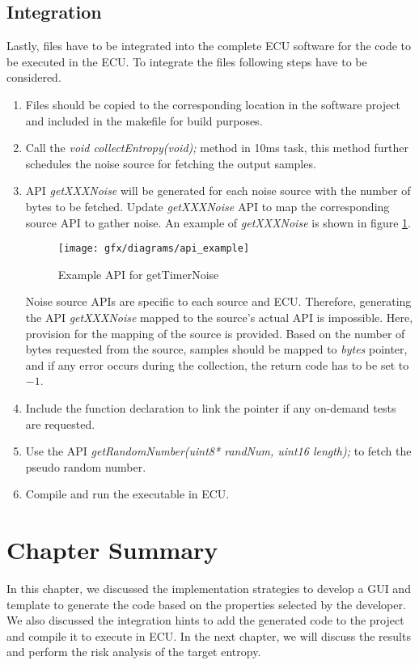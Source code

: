 \subsection{Integration}
\label{subsec:Imp:FI:Int}
Lastly, files have to be integrated into the complete ECU software for the code to be executed in the ECU. To integrate the files following steps have to be considered.
\begin{enumerate}
	\item Files should be copied to the corresponding location in the software project and included in the makefile for build purposes.
	
	\item Call the \textit{void collectEntropy(void);} method in 10ms task, this method further schedules the noise source for fetching the output samples.
	
	\item API \textit{getXXXNoise} will be generated for each noise source with the number of bytes to be fetched. Update \textit{getXXXNoise} API to map the corresponding source API to gather noise. An example of \textit{getXXXNoise} is shown in figure \ref{fig:5:11}.
	\begin{figure}[!h]
		\centering
		\texttt{[image: gfx/diagrams/api\_example]}
		\caption{Example API for getTimerNoise}
		\label{fig:5:11}
	\end{figure}	
	
	Noise source APIs are specific to each source and ECU. Therefore, generating the API \textit{getXXXNoise} mapped to the source's actual API is impossible. Here, provision for the mapping of the source is provided. Based on the number of bytes requested from the source, samples should be mapped to \textit{bytes} pointer, and if any error occurs during the collection, the return code has to be set to $-1$.
	
	\item Include the function declaration to link the pointer if any on-demand tests are requested.
	
	\item Use the API \textit{getRandomNumber(uint8* randNum, uint16 length);} to fetch the pseudo random number.
	
	\item Compile and run the executable in ECU.
	
\end{enumerate}


%
%
\section{Chapter Summary}
\label{sec:Imp:CS}
In this chapter, we discussed the implementation strategies to develop a GUI and template to generate the code based on the properties selected by the developer. We also discussed the integration hints to add the generated code to the project and compile it to execute in ECU. In the next chapter, we will discuss the results and perform the risk analysis of the target entropy.



